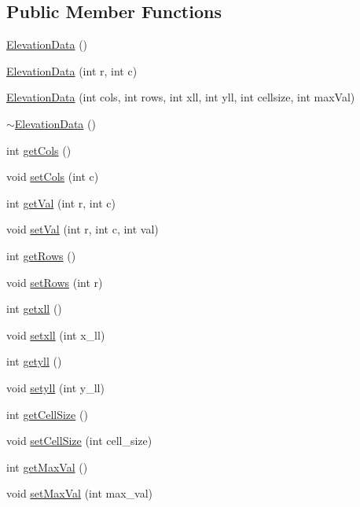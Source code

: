 \subsection*{Public Member Functions}
\begin{DoxyCompactItemize}
\item 
\hyperlink{classbridges_1_1dataset_1_1_elevation_data_a5b18c287b0c0030a5e454b705778a3f6}{Elevation\+Data} ()
\item 
\hyperlink{classbridges_1_1dataset_1_1_elevation_data_a89635a4704d9d4f67421661a74cc954d}{Elevation\+Data} (int r, int c)
\item 
\hyperlink{classbridges_1_1dataset_1_1_elevation_data_af51b3b3db6299140005988c03fcd12c9}{Elevation\+Data} (int cols, int rows, int xll, int yll, int cellsize, int max\+Val)
\item 
\hyperlink{classbridges_1_1dataset_1_1_elevation_data_a253e44f5f60891569c21ca926a356547}{$\sim$\+Elevation\+Data} ()
\item 
int \hyperlink{classbridges_1_1dataset_1_1_elevation_data_a9f5d6c6db9861715719485524b10e5d0}{get\+Cols} ()
\item 
void \hyperlink{classbridges_1_1dataset_1_1_elevation_data_adf57abd5e1e058ca6b0eb093aa5c7a11}{set\+Cols} (int c)
\item 
int \hyperlink{classbridges_1_1dataset_1_1_elevation_data_abdc18537c20774cf561d97987f1fb74a}{get\+Val} (int r, int c)
\item 
void \hyperlink{classbridges_1_1dataset_1_1_elevation_data_aa917c02a316f30d8e92d38bfb26fff9a}{set\+Val} (int r, int c, int val)
\item 
int \hyperlink{classbridges_1_1dataset_1_1_elevation_data_a6e721fe05638f95e22aef75f25cd4ae0}{get\+Rows} ()
\item 
void \hyperlink{classbridges_1_1dataset_1_1_elevation_data_a07c1929c481e06e6f1e01495aa319c57}{set\+Rows} (int r)
\item 
int \hyperlink{classbridges_1_1dataset_1_1_elevation_data_a5a4858f48b6f8e85d2210b736c890e91}{getxll} ()
\item 
void \hyperlink{classbridges_1_1dataset_1_1_elevation_data_a95e5b02c45c547908612e83641eb386c}{setxll} (int x\+\_\+ll)
\item 
int \hyperlink{classbridges_1_1dataset_1_1_elevation_data_ab021a75e1f0d606b00afcf57803f3503}{getyll} ()
\item 
void \hyperlink{classbridges_1_1dataset_1_1_elevation_data_a4ea6e380b7cc1531a0ae9b593dd98843}{setyll} (int y\+\_\+ll)
\item 
int \hyperlink{classbridges_1_1dataset_1_1_elevation_data_a04f2482408b57ba8e3823025af1932b6}{get\+Cell\+Size} ()
\item 
void \hyperlink{classbridges_1_1dataset_1_1_elevation_data_a7014a6d2bbc8092995fbbf40d57a3fdf}{set\+Cell\+Size} (int cell\+\_\+size)
\item 
int \hyperlink{classbridges_1_1dataset_1_1_elevation_data_a59dbda36f7635ff382f6a51972f0ed5d}{get\+Max\+Val} ()
\item 
void \hyperlink{classbridges_1_1dataset_1_1_elevation_data_ae21e8da36d7b7ad93121aff7ef6d69ab}{set\+Max\+Val} (int max\+\_\+val)
\end{DoxyCompactItemize}


